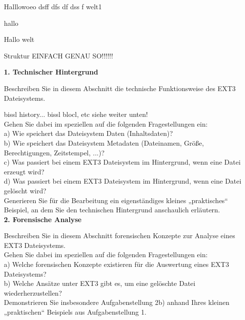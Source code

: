 
Halllowoeo dsff dfs  df dss f \cite{Carrier.06.01.2022}  welt1


hallo

Hallo \cite{Sciencedirect.07.01.2022}  welt




Struktur EINFACH GENAU SO!!!!!!

\textbf{1. Technischer Hintergrund\\}

Beschreiben Sie in diesem Abschnitt die technische Funktionsweise des EXT3 Dateisystems. 


bissl history... bissl blocl, etc siehe weiter unten!\\


Gehen Sie dabei im speziellen auf die folgenden Fragestellungen ein:\\

a) Wie speichert das Dateisystem Daten (Inhaltsdaten)?\\

b) Wie speichert das Dateisystem Metadaten (Dateinamen, Größe, Berechtigungen, Zeitstempel, ...)?\\

c) Was passiert bei einem EXT3 Dateisystem im Hintergrund, wenn eine Datei erzeugt wird?\\

d) Was passiert bei einem EXT3 Dateisystem im Hintergrund, wenn eine Datei gelöscht wird?\\

Generieren Sie für die Bearbeitung ein eigenständiges kleines „praktisches“ Beispiel, an dem Sie den technischen Hintergrund anschaulich erläutern.\\


\textbf{2. Forensische Analyse\\}

Beschreiben Sie in diesem Abschnitt forensischen Konzepte zur Analyse eines EXT3 Dateisystems.\\
Gehen Sie dabei im speziellen auf die folgenden Fragestellungen ein:\\

a) Welche forensischen Konzepte existieren für die Auswertung eines EXT3 Dateisystems?\\

b) Welche Ansätze unter EXT3 gibt es, um eine gelöschte Datei wiederherzustellen?\\

Demonstrieren Sie insbesondere Aufgabenstellung 2b) anhand Ihres kleinen „praktischen“ Beispiels aus Aufgabenstellung 1.\\










